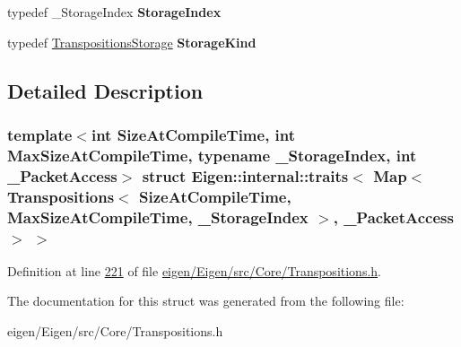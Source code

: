 \begin{DoxyCompactItemize}
\item 
\mbox{\label{struct_eigen_1_1internal_1_1traits_3_01_map_3_01_transpositions_3_01_size_at_compile_time_00_01_1a60846531a8bf67fbbfd4180820bbd1_ab81b76d6ea129d36f31200ca3a778278}} 
typedef \+\_\+\+Storage\+Index {\bfseries Storage\+Index}
\item 
\mbox{\label{struct_eigen_1_1internal_1_1traits_3_01_map_3_01_transpositions_3_01_size_at_compile_time_00_01_1a60846531a8bf67fbbfd4180820bbd1_a8d32ad3349c273f89a2e2e25b19bf182}} 
typedef \hyperlink{struct_eigen_1_1_transpositions_storage}{Transpositions\+Storage} {\bfseries Storage\+Kind}
\end{DoxyCompactItemize}


\subsection{Detailed Description}
\subsubsection*{template$<$int Size\+At\+Compile\+Time, int Max\+Size\+At\+Compile\+Time, typename \+\_\+\+Storage\+Index, int \+\_\+\+Packet\+Access$>$\newline
struct Eigen\+::internal\+::traits$<$ Map$<$ Transpositions$<$ Size\+At\+Compile\+Time, Max\+Size\+At\+Compile\+Time, \+\_\+\+Storage\+Index $>$, \+\_\+\+Packet\+Access $>$ $>$}



Definition at line \hyperlink{eigen_2_eigen_2src_2_core_2_transpositions_8h_source_l00221}{221} of file \hyperlink{eigen_2_eigen_2src_2_core_2_transpositions_8h_source}{eigen/\+Eigen/src/\+Core/\+Transpositions.\+h}.



The documentation for this struct was generated from the following file\+:\begin{DoxyCompactItemize}
\item 
eigen/\+Eigen/src/\+Core/\+Transpositions.\+h\end{DoxyCompactItemize}
